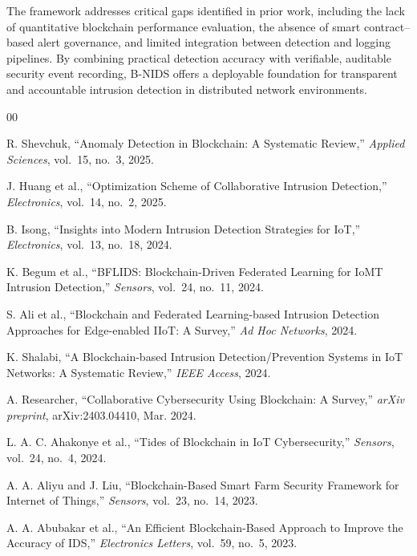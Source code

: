 \documentclass[conference]{IEEEtran}
\begin{document}
The framework addresses critical gaps identified in prior work, including the lack of quantitative blockchain performance evaluation, the absence of smart contract--based alert governance, and limited integration between detection and logging pipelines. By combining practical detection accuracy with verifiable, auditable security event recording, B-NIDS offers a deployable foundation for transparent and accountable intrusion detection in distributed network environments.


\begin{thebibliography}{00}

R. Shevchuk, ``Anomaly Detection in Blockchain: A Systematic Review,'' \textit{Applied Sciences}, vol.~15, no.~3, 2025.

J. Huang et al., ``Optimization Scheme of Collaborative Intrusion Detection,'' \textit{Electronics}, vol.~14, no.~2, 2025.

B. Isong, ``Insights into Modern Intrusion Detection Strategies for IoT,'' \textit{Electronics}, vol.~13, no.~18, 2024.

K. Begum et al., ``BFLIDS: Blockchain-Driven Federated Learning for IoMT Intrusion Detection,'' \textit{Sensors}, vol.~24, no.~11, 2024.

S. Ali et al., ``Blockchain and Federated Learning-based Intrusion Detection Approaches for Edge-enabled IIoT: A Survey,'' \textit{Ad Hoc Networks}, 2024.

K. Shalabi, ``A Blockchain-based Intrusion Detection/Prevention Systems in IoT Networks: A Systematic Review,'' \textit{IEEE Access}, 2024.

A. Researcher, ``Collaborative Cybersecurity Using Blockchain: A Survey,'' \textit{arXiv preprint}, arXiv:2403.04410, Mar. 2024.

L. A. C. Ahakonye et al., ``Tides of Blockchain in IoT Cybersecurity,'' \textit{Sensors}, vol.~24, no.~4, 2024.

A. A. Aliyu and J. Liu, ``Blockchain-Based Smart Farm Security Framework for Internet of Things,'' \textit{Sensors}, vol.~23, no.~14, 2023.

A. A. Abubakar et al., ``An Efficient Blockchain-Based Approach to Improve the Accuracy of IDS,'' \textit{Electronics Letters}, vol.~59, no.~5, 2023.


\end{thebibliography}
\end{document}
